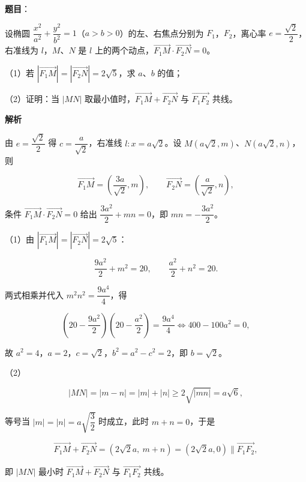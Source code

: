 \begin{answer}

\textbf{题目}：

设椭圆 $\dfrac{x^2}{a^2}+\dfrac{y^2}{b^2}=1$（$a>b>0$）的左、右焦点分别为 $F_1$，$F_2$，离心率 $e=\dfrac{\sqrt2}2$，右准线为 $l$，$M$、$N$ 是 $l$ 上的两个动点，$\overrightarrow{F_1M}\cdot\overrightarrow{F_2N}=0$。

（1）若 $\left|\overrightarrow{F_1M}\right|=\left|\overrightarrow{F_2N}\right|=2\sqrt5$，求 $a$、$b$ 的值；

（2）证明：当 $|MN|$ 取最小值时，$\overrightarrow{F_1M}+\overrightarrow{F_2N}$ 与 $\overrightarrow{F_1F_2}$ 共线。
\nopagebreak[4]
\begin{center}\end{center}
\nopagebreak[4]
\textbf{解析}

由 $e=\dfrac{\sqrt2}2$ 得 $c=\dfrac a{\sqrt2}$，右准线 $l:x=a\sqrt2$。设 $M(a\sqrt2,m)$、$N(a\sqrt2,n)$，则

\nopagebreak[4]
\[\overrightarrow{F_1M}=\left(\frac{3a}{\sqrt2},m\right),\qquad \overrightarrow{F_2N}=\left(\frac a{\sqrt2},n\right),\]

条件 $\overrightarrow{F_1M}\cdot\overrightarrow{F_2N}=0$ 给出 $\dfrac{3a^2}2+mn=0$，即 $mn=-\dfrac{3a^2}2$。

（1）由 $\left|\overrightarrow{F_1M}\right|=\left|\overrightarrow{F_2N}\right|=2\sqrt5$：

\nopagebreak[4]
\[\frac{9a^2}2+m^2=20,\qquad \frac{a^2}2+n^2=20.\]

两式相乘并代入 $m^2n^2=\dfrac{9a^4}4$，得

\nopagebreak[4]
\[\left(20-\frac{9a^2}2\right)\left(20-\frac{a^2}2\right)=\frac{9a^4}4\iff 400-100a^2=0,\]

故 $a^2=4$，$a=2$，$c=\sqrt2$，$b^2=a^2-c^2=2$，即 $b=\sqrt2$。

（2）

\nopagebreak[4]
\[|MN|=|m-n|=|m|+|n|\geqslant2\sqrt{|mn|}=a\sqrt6,\]

等号当 $|m|=|n|=a\sqrt{\dfrac32}$ 时成立，此时 $m+n=0$，于是

\nopagebreak[4]
\[\overrightarrow{F_1M}+\overrightarrow{F_2N}=\left(2\sqrt2a,\ m+n\right)=(2\sqrt2a,0)\parallel\overrightarrow{F_1F_2},\]

即 $|MN|$ 最小时 $\overrightarrow{F_1M}+\overrightarrow{F_2N}$ 与 $\overrightarrow{F_1F_2}$ 共线。


\end{answer}
